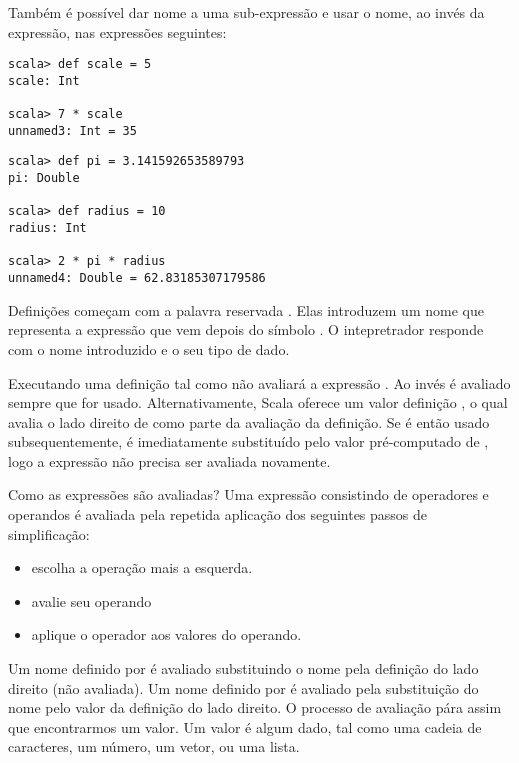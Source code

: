Tamb\'{e}m \'{e} poss\'{i}vel dar nome a uma sub-express\~{a}o e usar o nome, ao inv\'{e}s da express\~{a}o, 
nas express\~{o}es seguintes:
\begin{lstlisting}
scala> def scale = 5
scale: Int

scala> 7 * scale
unnamed3: Int = 35
\end{lstlisting}
\begin{lstlisting}
scala> def pi = 3.141592653589793
pi: Double

scala> def radius = 10
radius: Int

scala> 2 * pi * radius
unnamed4: Double = 62.83185307179586
\end{lstlisting}


Defini\c{c}\~{o}es come\c{c}am com a palavra reservada . Elas introduzem um nome
que representa a express\~{a}o que vem depois do s\'{i}mbolo \code{=}. O intepretrador
responde com o nome introduzido e o seu tipo de dado.

Executando uma defini\c{c}\~{a}o tal como  n\~{a}o avaliar\'{a} a express\~{a}o . 
Ao inv\'{e}s  \'{e} avaliado sempre que  for usado. Alternativamente, Scala 
oferece um valor defini\c{c}\~{a}o , o qual avalia o lado direito de 
como parte da avalia\c{c}\~{a}o da defini\c{c}\~{a}o. Se  \'{e} ent\~{a}o usado subsequentemente, \'{e} 
imediatamente substitu\'{i}do pelo valor pr\'{e}-computado de , logo a express\~{a}o n\~{a}o 
precisa ser avaliada novamente.

Como as express\~{o}es s\~{a}o avaliadas? Uma express\~{a}o consistindo de operadores e 
operandos \'{e} avaliada pela repetida aplica\c{c}\~{a}o dos seguintes passos de simplifica\c{c}\~{a}o:
\begin{itemize}
\item escolha a opera\c{c}\~{a}o mais a esquerda.
\item avalie seu operando
\item aplique o operador aos valores do operando.
\end{itemize}
Um nome definido por  \'{e} avaliado substituindo o nome pela defini\c{c}\~{a}o do lado
direito (n\~{a}o avaliada). Um nome definido por  \'{e} avaliado pela substitui\c{c}\~{a}o do 
nome pelo valor da defini\c{c}\~{a}o do lado direito. O processo de avalia\c{c}\~{a}o p\'{a}ra assim que 
encontrarmos um valor. Um valor \'{e} algum dado, tal como uma cadeia de caracteres, um n\'{u}mero, 
um vetor, ou uma lista.

